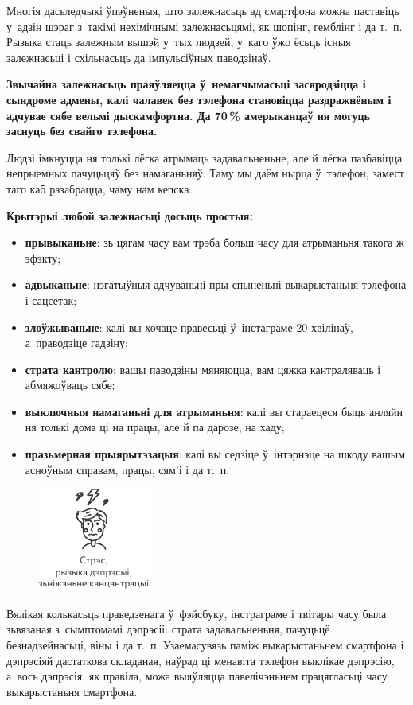 Многія дасьледчыкі ўпэўненыя, што залежнасьць ад смартфона можна паставіць у~адзін шэраг з~такімі нехімічнымі залежнасьцямі, як шопінг, гемблінг і да т.~п. Рызыка стаць залежным вышэй у~тых людзей, у~каго ўжо ёсьць існыя залежнасьці і схільнасьць да імпульсіўных паводзінаў.

\textbf{Звычайна залежнасьць праяўляецца ў~немагчымасьці засяродзіцца і сындроме адмены, калі чалавек без тэлефона становіцца раздражнёным і адчувае сябе вельмі дыскамфортна. Да 70\,\% амерыканцаў ня могуць заснуць без свайго тэлефона.} 

Людзі імкнуцца ня толькі лёгка атрымаць задавальненьне, але й лёгка пазбавіцца непрыемных пачуцьцяў без намаганьняў. Таму мы даём нырца ў~тэлефон, замест таго каб разабрацца, чаму нам кепска.

\textbf{Крытэрыі любой залежнасьці досыць простыя:} 
\begin{itemize}
  \item \textbf{прывыканьне}: зь цягам часу вам трэба больш часу для атрыманьня такога ж эфэкту;
  \item \textbf{адвыканьне}: нэгатыўныя адчуваньні пры спыненьні выкарыстаньня тэлефона і сацсетак;
  \item \textbf{злоўжываньне}: калі вы хочаце правесьці ў~інстаграме 20 хвілінаў, а~праводзіце гадзіну;
  \item \textbf{страта кантролю}: вашы паводзіны мяняюцца, вам цяжка кантраляваць і абмяжоўваць сябе;
  \item \textbf{выключныя намаганьні для атрыманьня}: калі вы стараецеся быць анляйн ня толькі дома ці на працы, але й па дарозе, на хаду;
  \item \textbf{празьмерная прыярытэзацыя}: калі вы седзіце ў~інтэрнэце на шкоду вашым асноўным справам, працы, сям'і і да т.~п.
\end{itemize}

\begin{figure}[htb!]
  \centering
  \includegraphics[scale=1.5]{willpower/ch13/2.pdf}
\end{figure}

Вялікая колькасьць праведзенага ў~фэйсбуку, інстраграме і твітары часу была зьвязаная з~сымптомамі дэпрэсіі: страта задавальненьня, пачуцьцё безнадзейнасьці, віны і да т.~п. Узаемасувязь паміж выкарыстаньнем смартфона і дэпрэсіяй дастаткова складаная, наўрад ці менавіта тэлефон выклікае дэпрэсію, а~вось дэпрэсія, як правіла, можа выяўляцца павелічэньнем працягласьці часу выкарыстаньня смартфона.

